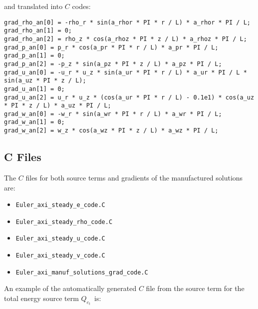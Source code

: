 \documentclass[10pt]{article}
\begin{document}
 and translated into $C$ codes:
\begin{small}
 \begin{verbatim}
grad_rho_an[0] = -rho_r * sin(a_rhor * PI * r / L) * a_rhor * PI / L;
grad_rho_an[1] = 0;
grad_rho_an[2] = rho_z * cos(a_rhoz * PI * z / L) * a_rhoz * PI / L;
grad_p_an[0] = p_r * cos(a_pr * PI * r / L) * a_pr * PI / L;
grad_p_an[1] = 0;
grad_p_an[2] = -p_z * sin(a_pz * PI * z / L) * a_pz * PI / L;
grad_u_an[0] = -u_r * u_z * sin(a_ur * PI * r / L) * a_ur * PI / L * sin(a_uz * PI * z / L);
grad_u_an[1] = 0;
grad_u_an[2] = u_r * u_z * (cos(a_ur * PI * r / L) - 0.1e1) * cos(a_uz * PI * z / L) * a_uz * PI / L;
grad_w_an[0] = -w_r * sin(a_wr * PI * r / L) * a_wr * PI / L;
grad_w_an[1] = 0;
grad_w_an[2] = w_z * cos(a_wz * PI * z / L) * a_wz * PI / L;
\end{verbatim}
\end{small}



\subsection{C Files}
The $C$ files for both source terms and gradients of the  manufactured solutions are:
\begin{itemize}
\item \texttt{Euler\_axi\_steady\_e\_code.C}
 \item \texttt{Euler\_axi\_steady\_rho\_code.C}
 \item \texttt{Euler\_axi\_steady\_u\_code.C}
 \item \texttt{Euler\_axi\_steady\_v\_code.C}
 \item \texttt{Euler\_axi\_manuf\_solutions\_grad\_code.C}
\end{itemize}

An example of the automatically generated $C$ file from the source term for the total energy source term $Q_{e_t}$~is:
\end{document}
